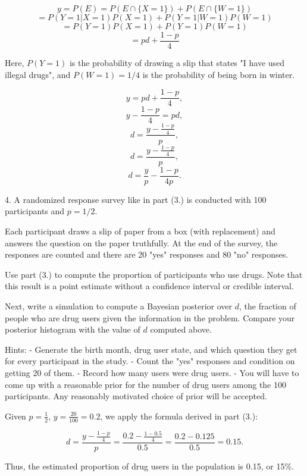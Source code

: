 \documentclass[12pt]{article}
\begin{document}
\[ y = P(E) = P(E \cap \{X = 1\}) + P(E \cap \{W = 1\}) \]
\[ = P(Y = 1 | X = 1)P(X = 1) + P(Y = 1 | W = 1)P(W = 1) \]
\[ = P(Y = 1)P(X = 1) + P(Y = 1)P(W = 1) \]
\[ = pd + \frac{1 - p}{4} \]

Here, \(P(Y = 1)\) is the probability of drawing a slip that states "I have used illegal drugs", and \(P(W = 1) = 1/4\) is the probability of being born in winter. 

\[ y = pd + \frac{1 - p}{4}, \]
\[ y - \frac{1 - p}{4} = pd, \]
\[ d = \frac{y - \frac{1 - p}{4}}{p}, \]
\[ d = \frac{y - \frac{1 - p}{4}}{p}, \]
\[ d = \frac{y}{p} - \frac{1-p}{4p}.\]

\begin{q}
4. A randomized response survey like in part (3.) is conducted with 100 participants and \(p=1 / 2\).

Each participant draws a slip of paper from a box (with replacement) and answers the question on the paper truthfully. At the end of the survey, the responses are counted and there are 20 "yes" responses and 80 "no" responses.

Use part (3.) to compute the proportion of participants who use drugs. Note that this result is a point estimate without a confidence interval or credible interval.

Next, write a simulation to compute a Bayesian posterior over \(d\), the fraction of people who are drug users given the information in the problem. Compare your posterior histogram with the value of \(d\) computed above.

Hints:
- Generate the birth month, drug user state, and which question they get for every participant in the study.
- Count the "yes" responses and condition on getting 20 of them.
- Record how many users were drug users.
- You will have to come up with a reasonable prior for the number of drug users among the 100 participants. Any reasonably motivated choice of prior will be accepted.
\end{q}

Given \(p = \frac{1}{2}\), \(y = \frac{20}{100} = 0.2\), we apply the formula derived in part (3.):

\[ d = \frac{y - \frac{1 - p}{4}}{p} = \frac{0.2 - \frac{1 - 0.5}{4}}{0.5} = \frac{0.2 - 0.125}{0.5} = 0.15. \]

Thus, the estimated proportion of drug users in the population is 0.15, or 15\%.
\end{document}
